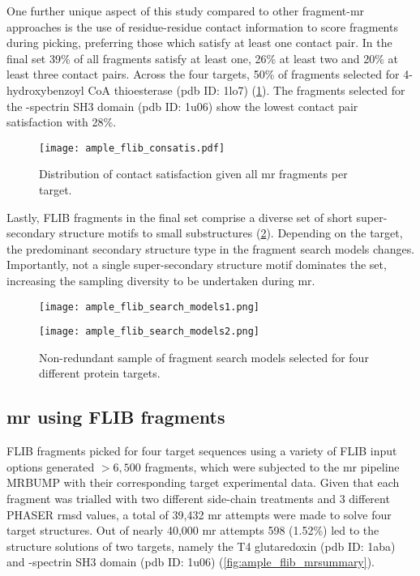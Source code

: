 One further unique aspect of this study compared to other fragment-\gls{mr} approaches is the use of residue-residue contact information to score fragments during picking, preferring those which satisfy at least one contact pair. In the final set 39\% of all fragments satisfy at least one, 26\% at least two and 20\% at least three contact pairs. Across the four targets, 50\% of fragments selected for 4-hydroxybenzoyl CoA thioesterase (\gls{pdb} ID: 1lo7) (\cref{fig:ample_flib_consatis}). The fragments selected for the \textalpha-spectrin SH3 domain (\gls{pdb} ID: 1u06) show the lowest contact pair satisfaction with 28\%.

\begin{figure}[H]
	\centering
	\texttt{[image: ample\_flib\_consatis.pdf]}
	\caption[Contact satisfaction of FLIB-derived fragments]{Distribution of contact satisfaction given all \gls{mr} fragments per target.}
	\label{fig:ample_flib_consatis}
\end{figure}

Lastly, FLIB fragments in the final set comprise a diverse set of short super-secondary structure motifs to small substructures (\cref{fig:ample_flib_search_models}). Depending on the target, the predominant secondary structure type in the fragment search models changes. Importantly, not a single super-secondary structure motif dominates the set, increasing the sampling diversity to be undertaken during \gls{mr}.

\begin{figure}[H]
	\centering
	\texttt{[image: ample\_flib\_search\_models1.png]}
\end{figure}

\begin{figure}[H]\ContinuedFloat
	\centering
	\texttt{[image: ample\_flib\_search\_models2.png]}
	\caption[Fragment search models derived from FLIB]{Non-redundant sample of fragment search models selected for four different protein targets.}
	\label{fig:ample_flib_search_models}
\end{figure}

\subsection{\acrlong{mr} using FLIB fragments}
FLIB fragments picked for four target sequences using a variety of FLIB input options generated $>6,500$ fragments, which were subjected to the \gls{mr} pipeline MRBUMP with their corresponding target experimental data. Given that each fragment was trialled with two different side-chain treatments and 3 different PHASER \gls{rmsd} values, a total of 39,432 \gls{mr} attempts were made to solve four target structures. Out of nearly 40,000 \gls{mr} attempts 598 (1.52\%) led to the structure solutions of two targets, namely the T4 glutaredoxin (\gls{pdb} ID: 1aba) and \textalpha-spectrin SH3 domain (\gls{pdb} ID: 1u06) (\cref{fig:ample_flib_mrsummary}).

